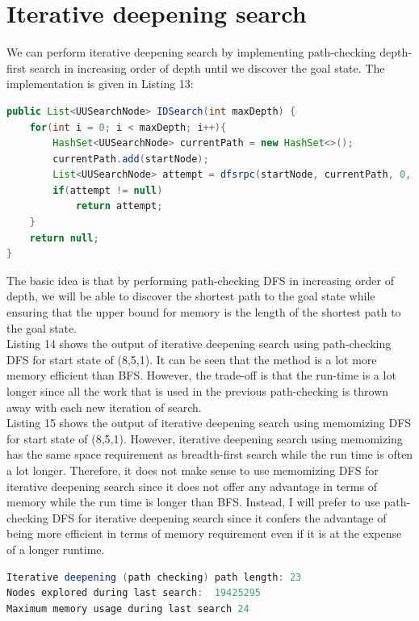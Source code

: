 \documentclass[9.5pt]{extarticle}
\begin{document}
\section{Iterative deepening search}

We can perform iterative deepening search by implementing path-checking depth-first search in increasing order of depth until we discover the goal state. The implementation is given in Listing 13:\\

\begin{lstlisting}[language=java,caption={Iterative deepening search}]
public List<UUSearchNode> IDSearch(int maxDepth) {
	for(int i = 0; i < maxDepth; i++){
		HashSet<UUSearchNode> currentPath = new HashSet<>();
		currentPath.add(startNode);
		List<UUSearchNode> attempt = dfsrpc(startNode, currentPath, 0, i);
		if(attempt != null)
			return attempt;
	}
	return null;
}
\end{lstlisting}

The basic idea is that by performing path-checking DFS in increasing order of depth, we will be able to discover the shortest path to the goal state while ensuring that the upper bound for memory is the length of the shortest path to the goal state. \\

Listing 14 shows the output of iterative deepening search using path-checking DFS for start state of (8,5,1). It can be seen that the method is a lot more memory efficient than BFS. However, the trade-off is that the run-time is a lot longer since all the work that is used in the previous path-checking is thrown away with each new iteration of search.\\

Listing 15 shows the output of iterative deepening search using memomizing DFS for start state of (8,5,1). However, iterative deepening search using memomizing has the same space requirement as breadth-first search while the run time is often a lot longer. Therefore, it does not make sense to use memomizing DFS for iterative deepening search since it does not offer any advantage in terms of memory while the run time is longer than BFS. Instead, I will prefer to use path-checking DFS for iterative deepening search since it confers the advantage of being more efficient in terms of memory requirement even if it is at the expense of  a longer runtime.

\begin{lstlisting}[language=java,caption={Iterative deepening search using path-checking DFS for start state of (8,5,1)}]
Iterative deepening (path checking) path length: 23 
Nodes explored during last search:  19425295
Maximum memory usage during last search 24
\end{lstlisting}
\end{document}
